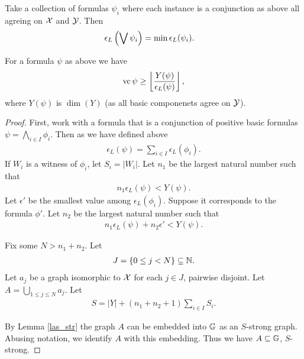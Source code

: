 \begin{Definition} [Disjunction]
  Take a collection of formulas $\psi_i$ where each instance is a conjunction as above all agreing on $\mathcal X$ and $\mathcal Y$.
  Then
  \begin{align*}
    \epsilon_L\left(\bigvee \psi_i\right) &= \min \epsilon_L(\psi_i).
  \end{align*}
\end{Definition}
\begin{Theorem} \label{main_lower}
  For a formula $\psi$ as above we have
  \begin{align*}
    \operatorname{vc} \psi \geq \left \lfloor \frac{Y(\psi)}{\epsilon_L(\psi)} \right \rfloor,
  \end{align*}
  where $Y(\psi)$ is $\dim(Y)$ (as all basic componenets agree on $\mathcal Y$).
\end{Theorem}
\begin{proof}
  First, work with a formula that is a conjunction of positive basic formulas $\psi = \bigwedge_{i \in I} \phi_i$.
  Then as we have defined above
  \begin{align*}
    \epsilon_L(\psi) = \sum_{i \in I} \epsilon_L(\phi_i).
  \end{align*}
  If $W_i$ is a witness of $\phi_i$, let $S_i = |W_i|$.
  Let $n_1$ be the largest natural number such that
  \begin{align*}
    n_1 \epsilon_L(\psi) < Y(\psi).
  \end{align*}
  Let $\epsilon'$ be the smallest value among $\epsilon_L(\phi_i)$.
  Suppose it corresponds to the formula $\phi'$.
  Let $n_2$ be the largest natural number such that
  \begin{align*}
    n_1 \epsilon_L(\psi) + n_2 \epsilon' < Y(\psi).
  \end{align*}

  Fix some $N > n_1 + n_2$.
  Let 
  \begin{align*}
    J = \left\{0 \leq j < N\right\} \subseteq \mathbb{N}.
  \end{align*}
  Let $a_j$ be a graph isomorphic to $\mathcal X$ for each $j \in J$, pairwise disjoint.
  Let $A = \bigcup_{1 \leq j \leq N} a_j$.
  Let 
  \begin{align*}
    S = |Y| + (n_1 + n_2 + 1) \sum_{i \in I} S_i.
  \end{align*}

  By Lemma \ref{las_str} the graph $A$ can be embedded into $\mathbb G$ as an $S$-strong graph. 
  Abusing notation, we identify $A$ with this embedding.
  Thus we have $A \subseteq \mathbb G$, $S$-strong. 


\end{proof}
